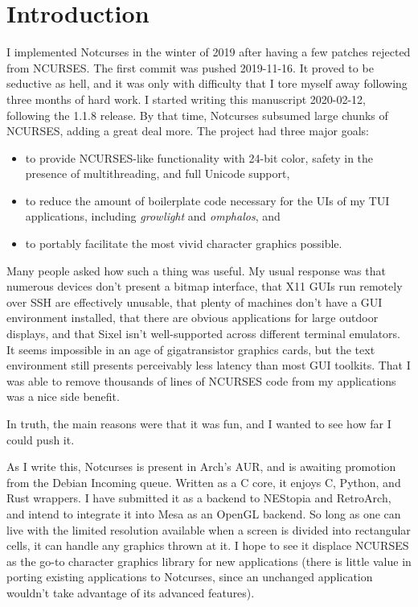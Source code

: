 \documentclass[letterpaper,10pt]{article}
\newenvironment{denseitemize}{
  \begin{itemize}
      \setlength{\itemsep}{0pt}
}{
  \end{itemize}
}
\newcommand\CC{C\nolinebreak\hspace{-.05em}\raisebox{.4ex}{\relsize{-3}{\textbf{+}}}\nolinebreak\hspace{-.10em}\raisebox{.4ex}{\relsize{-3}{\textbf{+}}}\hspace{.2em}}
\begin{document}
\section{Introduction}

I implemented Notcurses in the winter of 2019 after having a few patches
rejected from NCURSES. The first commit was pushed 2019-11-16. It proved to
be seductive as hell, and it was only with difficulty that I tore myself away
following three months of hard work. I started writing this manuscript
2020-02-12, following the 1.1.8 release. By that time, Notcurses subsumed large
chunks of NCURSES, adding a great deal more. The project had three major goals:

\begin{denseitemize}
\item to provide NCURSES-like functionality with 24-bit color, safety in the
    presence of multithreading, and full Unicode support,
\item to reduce the amount of boilerplate code necessary for the UIs of my
    TUI applications, including \textit{growlight} and \textit{omphalos}, and
\item to portably facilitate the most vivid character graphics possible.
\end{denseitemize}

Many people asked how such a thing was useful. My usual response was that
numerous devices don't present a bitmap interface, that X11 GUIs run remotely
over SSH are effectively unusable, that plenty of machines don't have a GUI
environment installed, that there are obvious applications for large outdoor
displays, and that Sixel isn't well-supported across different
terminal emulators. It seems impossible in an age of gigatransistor graphics
cards, but the text environment still presents perceivably less latency
than most GUI toolkits. That I was able to remove thousands of lines
of NCURSES code from my applications was a nice side benefit.

In truth, the main reasons were that it was fun, and I wanted to see how far
I could push it.

As I write this, Notcurses is present in Arch's AUR, and is awaiting promotion
from the Debian Incoming queue. Written as a C core, it enjoys \CC, Python, and
Rust wrappers. I have submitted it as a backend to NEStopia and RetroArch, and
intend to integrate it into Mesa as an OpenGL backend. So long as one can live
with the limited resolution available when a screen is divided into rectangular
cells, it can handle any graphics thrown at it. I hope to see it displace
NCURSES as the go-to character graphics library for new applications (there is
little value in porting existing applications to Notcurses, since an unchanged
application wouldn't take advantage of its advanced features).
\end{document}
